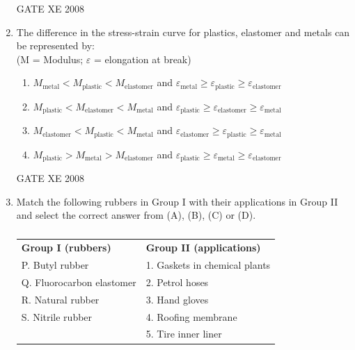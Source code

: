 \documentclass[12pt]{article}
\begin{document}
\begin{enumerate}
\begin{enumerate}
\end{enumerate}

GATE XE 2008

\item The difference in the stress-strain curve for plastics, elastomer and metals can be represented by: \\
(M = Modulus; $\varepsilon$ = elongation at break)

\begin{enumerate}
\item  $M_{\text{metal}} < M_{\text{plastic}} < M_{\text{elastomer}}$ and $\varepsilon_{\text{metal}} \geq \varepsilon_{\text{plastic}} \geq \varepsilon_{\text{elastomer}}$ 
\item  $M_{\text{plastic}} < M_{\text{elastomer}} < M_{\text{metal}}$ and $\varepsilon_{\text{plastic}} \geq \varepsilon_{\text{elastomer}} \geq \varepsilon_{\text{metal}}$ 
\item  $M_{\text{elastomer}} < M_{\text{plastic}} < M_{\text{metal}}$ and $\varepsilon_{\text{elastomer}} \geq \varepsilon_{\text{plastic}} \geq \varepsilon_{\text{metal}}$ 
\item  $M_{\text{plastic}} > M_{\text{metal}} > M_{\text{elastomer}}$ and $\varepsilon_{\text{plastic}} \geq \varepsilon_{\text{metal}} \geq \varepsilon_{\text{elastomer}}$
\end{enumerate}

GATE XE 2008

\item Match the following rubbers in Group I with their applications in Group II and select the correct answer from (A), (B), (C) or (D).

\begin{table}[H]     \centering     \caption{}     \label{}     \begin{tabular}{l l}
\textbf{Group I (rubbers)} & \textbf{Group II (applications)} \\
P. Butyl rubber & 1. Gaskets in chemical plants \\
Q. Fluorocarbon elastomer & 2. Petrol hoses \\
R. Natural rubber & 3. Hand gloves \\
S. Nitrile rubber & 4. Roofing membrane \\
& 5. Tire inner liner \\
\end{tabular} \end{table}


\end{enumerate}
\end{document}
